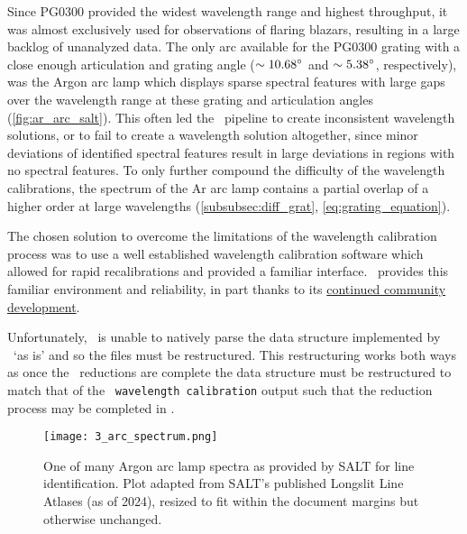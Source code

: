 Since PG$0300$ provided the widest wavelength range and highest throughput, it was almost exclusively used for observations of flaring blazars, resulting in a large backlog of unanalyzed data. The only arc available for the PG$0300$ grating with a close enough articulation and grating angle ($\sim 10.68\hbox{$^\circ$}$ and $\sim 5.38\hbox{$^\circ$}$, respectively), was the Argon arc lamp which displays sparse spectral features with large gaps over the wavelength range at these grating and articulation angles (\autoref{fig:ar_arc_salt}). This often led the \polsalt\ pipeline to create inconsistent wavelength solutions, or to fail to create a wavelength solution altogether, since minor deviations of identified spectral features result in large deviations in regions with no spectral features. To only further compound the difficulty of the wavelength calibrations, the spectrum of the \gls{Ar} arc lamp contains a partial overlap of a higher order at large wavelengths (\autoref{subsubsec:diff_grat}, \autoref{eq:grating_equation}).

The chosen solution to overcome the limitations of the wavelength calibration process was to use a well established wavelength calibration software which allowed for rapid recalibrations and provided a familiar interface. \iraf\ provides this familiar environment and reliability, in part thanks to its \href{https://github.com/iraf-community/iraf}{continued community development}.

Unfortunately, \iraf\ is unable to natively parse the data structure implemented by \polsalt\ `as is' and so the files must be restructured. This restructuring works both ways as once the \iraf\ reductions are complete the data structure must be restructured to match that of the \polsalt\ \texttt{wavelength calibration} output such that the reduction process may be completed in \polsalt.

\begin{figure}[t]
    \centering
    \texttt{[image: 3\_arc\_spectrum.png]}
    \caption{One of many Argon arc lamp spectra as provided by \gls{SALT} for line identification. Plot adapted from \gls{SALT}'s published Longslit Line Atlases (as of 2024), resized to fit within the document margins but otherwise unchanged.\protect\footnotemark}
    \label{fig:ar_arc_salt}
\end{figure}

